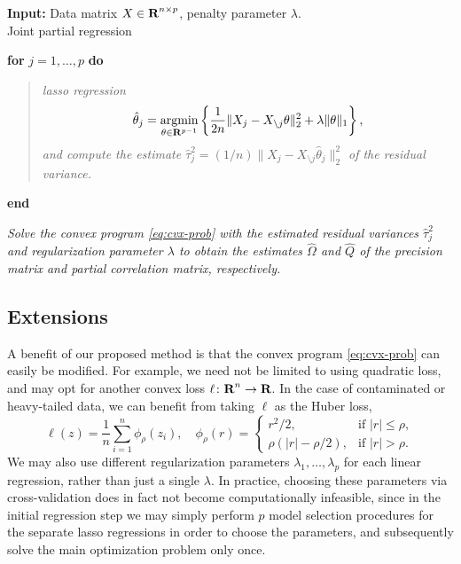 \documentclass{article}
\begin{document}
\begin{algorithm}[ht]
    \SetAlgoLined 
    
    \textbf{Input:} {Data matrix $X \in {\mbox{\bf R}}^{n \times p}$, penalty parameter
    $\lambda$.} \\

    \caption{\sc Joint partial regression}
    
    \BlankLine
    
    \textbf{for} {$j = 1, \dots, p$} \textbf{do} {
    \begin{quote} \it lasso regression
        \[
            \hat\theta_j = \argmin_{\theta \in \R^{p-1}} \left\{\frac{1}{2n} \|X_j - X_{\setminus j} \theta\|_2^2 + \lambda \|\theta\|_1\right\},
        \]
        and compute the estimate $\hat\tau_j^2 = (1/n) \|X_j - X_{\setminus
        j}\hat\theta_j\|_2^2$ of the residual variance.
    \end{quote}
    } \textbf{end}
    
    \textit{Solve the convex program \eqref{eq:cvx-prob} with the estimated residual
    variances $\hat\tau_j^2$ and regularization parameter $\lambda$ to obtain the
    estimates $\widehat{\Omega}$ and $\widehat{Q}$ of the precision matrix and
    partial correlation matrix, respectively.}
    \label{algo:jpr}
\end{algorithm}


\subsection{Extensions}

A benefit of our proposed method is that the convex program \eqref{eq:cvx-prob}
can easily be modified. For example, we need not be limited to using quadratic
loss, and may opt for another convex loss $\ell \colon {\mbox{\bf R}}^n \to {\mbox{\bf R}}$. In
the case of contaminated or heavy-tailed data, we can benefit from taking $\ell$
as the Huber loss,
\begin{equation}\label{eq:huber-loss}
    \ell(z) = \frac{1}{n} \sum_{i=1}^{n} \phi_\rho (z_i), \quad  \phi_\rho(r) = \begin{cases}
        r^2 / 2, & \text{if } |r| \leq \rho, \\
        \rho (|r| - \rho / 2), & \text{if } |r| > \rho.
    \end{cases}
\end{equation}
We may also use different regularization parameters $\lambda_1, \dots,
\lambda_p$ for each linear regression, rather than just a single $\lambda$. In
practice, choosing these parameters via cross-validation does in fact not
become computationally infeasible, since in the initial regression step we may
simply perform $p$ model selection procedures for the separate lasso
regressions in order to choose the parameters, and subsequently solve the main
optimization problem only once.
\end{document}
